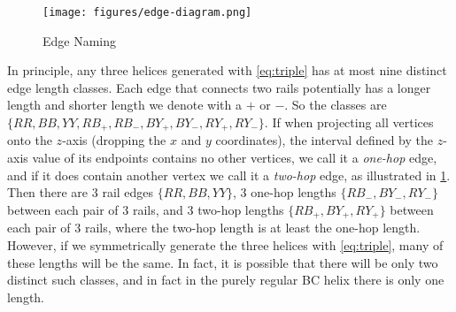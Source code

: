 \documentclass[twocolumn,10pt]{asme2ej}
\begin{document}
\begin{figure}
  \centering
     \texttt{[image: figures/edge-diagram.png]}
     \caption{Edge Naming}
  \label{fig:naming}
\end{figure}

In principle, any three helices generated with \cref{eq:triple}
has at most nine distinct edge length classes. Each edge that connects
two rails potentially has a longer length and shorter length we denote with
a $+$ or $-$. So the classes are $\{ RR, BB, YY, RB_+, RB_-, BY_+, BY_-, RY_+, RY_- \}$.
If when projecting all vertices onto the $z$-axis (dropping the $x$ and $y$ coordinates),
the interval
defined by the $z$-axis value of its endpoints contains no other vertices,
we call it a \emph{one-hop} edge, and if it does contain another vertex we
call it a \emph{two-hop} edge, as illustrated in \cref{fig:naming}.
Then there are 
3 rail edges $\{ RR, BB, YY\}$,
3 one-hop lengths $\{ RB_-, BY_-, RY_- \}$ between each pair of 3 rails,
and 3 two-hop
lengths $\{ RB_{+}, BY_+, RY_+ \}$ between each pair of 3 rails,
where the two-hop length is at least the one-hop length.
However, if we symmetrically generate the three helices  with \cref{eq:triple},
many of these lengths will be the same.
In fact, it is possible that there
will be only two distinct such classes, and in fact in  the purely regular BC helix there is only one length.
\end{document}
